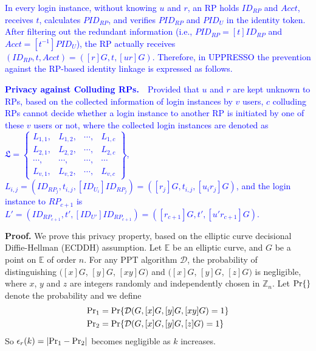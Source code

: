 \vspace{1mm}
\textcolor{blue}{In every login instance,
    without knowing $u$ and $r$,
    an RP holds $ID_{RP}$ and $Acct$, receives $t$, calculates $PID_{RP}$,
    and verifies $PID_{RP}$ and $PID_U$ in the identity token.
After filtering out the redundant information (i.e., $PID_{RP}= [t]{ID_{RP}}$ and $Acct = [t^{-1}]PID_{U}$),
    the RP actually receives $(ID_{RP}, t, Acct) = ([r]G, t, [ur]G)$.
Therefore, in UPPRESSO the prevention against the RP-based identity linkage is expressed as follows.}

\vspace{1mm}
\noindent\textcolor{blue}{\textbf{Privacy against Colluding RPs.}~~Provided that $u$ and $r$ are kept unknown to RPs,
based on the collected information of login instances by $v$ users,
$c$ colluding RPs cannot decide whether a login instance to another RP is initiated by one of these $v$ users or not,
    where
    the collected login instances are denoted as $\mathfrak{L}=\left\{ \begin{matrix}
L_{1,1}, & L_{1,2}, & \cdots, & L_{1,c}\\
L_{2,1}, & L_{2,2}, & \cdots, & L_{2,c}\\
\cdots, & \cdots, & \cdots, & \cdots\\
L_{v,1}, & L_{v,2}, & \cdots, & L_{v,c}
\end{matrix}\right\}$, $L_{i, j} = (ID_{RP_j}, t_{i, j}, [ID_{U_i}]{ID_{RP_j}}) = ([r_j]G, t_{i,j}, [u_ir_j]G)$,
    and the login instance to $RP_{c+1}$ is $L'=(ID_{RP_{c+1}}, t', [ID_{U'}]ID_{RP_{c+1}}) = ([r_{c+1}]G, t', [u'r_{c+1}]G)$.}


\vspace{0.75mm}
\noindent\textbf{Proof.}
We prove this privacy property,
 based on the elliptic curve decisional Diffie-Hellman (ECDDH) assumption. %
%
Let $\mathbb{E}$ be an elliptic curve,
    and $G$ be a point on $\mathbb{E}$ of order $n$.
For any PPT algorithm $\mathcal{D}$, the probability of distinguishing
 $([x]G$, $[y]G$, $[xy]G)$ and $([x]G$, $[y]G$, $[z]G)$
is negligible,
 where $x$, $y$ and $z$ are integers randomly and independently chosen in $\mathbb{Z}_n$.
Let  ${\rm Pr}\{\}$ denote the probability and
 we define
\begin{align*}
&{\rm Pr}_1 =  {\rm Pr}\{\mathcal{D}(G, [x]G, [y]G, [xy]G)=1\} \\
&{\rm Pr}_2 =  {\rm Pr}\{\mathcal{D}(G, [x]G, [y]G, [z]G)=1\}
\end{align*}
So $\epsilon_{r}(k) = |{\rm Pr}_1 - {\rm Pr}_2|$ becomes negligible as $k$ increases.

